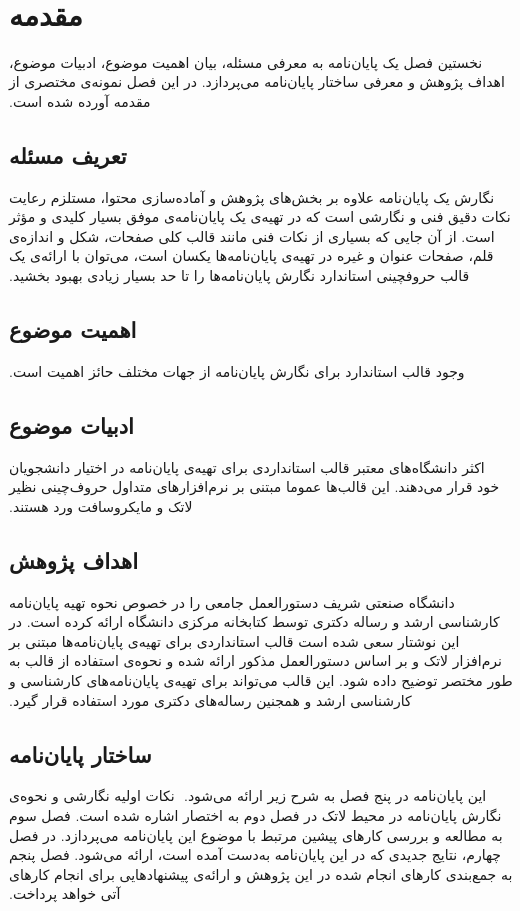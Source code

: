 
‫\chapter{مقدمه}
‫
‫نخستین فصل یک پایان‌نامه به معرفی مسئله، بیان اهمیت موضوع، ادبیات موضوع،
‫اهداف پژوهش و معرفی ساختار پایان‌نامه می‌پردازد.
‫در این فصل نمونه‌ی مختصری از مقدمه آورده شده است.
‫
‫\section{تعریف مسئله}
‫
‫نگارش یک پایان‌نامه‌ علاوه بر بخش‌های پژوهش و آماده‌سازی محتوا،
‫مستلزم رعایت نکات دقیق فنی و نگارشی است 
‫که در تهیه‌ی یک پایان‌نامه‌ی موفق بسیار کلیدی و مؤثر است.
‫از آن جایی که بسیاری از نکات فنی مانند قالب کلی صفحات، شکل و اندازه‌ی قلم، 
‫صفحات عنوان و غیره در تهیه‌ی پایان‌نامه‌ها یکسان است،
‫می‌توان با ارائه‌ی یک قالب حروفچینی استاندارد 
‫نگارش پایان‌نامه‌ها را تا حد بسیار زیادی بهبود بخشید.
‫
‫\section{اهمیت موضوع}
‫
‫وجود قالب استاندارد برای نگارش پایان‌نامه از جهات مختلف حائز اهمیت است.
‫
‫\section{ادبیات موضوع}
‫
‫اکثر دانشگاه‌های معتبر قالب استانداردی برای تهیه‌ی پایان‌نامه در اختیار دانشجویان خود قرار می‌دهند.
‫این قالب‌ها عموما مبتنی بر نرم‌افزارهای متداول حروف‌چینی نظیر لاتک و مایکروسافت ورد هستند.
‫‫
‫
‫\section{اهداف پژوهش}
‫
‫دانشگاه صنعتی شریف دستورالعمل جامعی را در خصوص
‫نحوه تهیه پایان‌نامه کارشناسی ارشد و رساله دکتری توسط کتابخانه مرکزی دانشگاه ارائه کرده است.
‫در این نوشتار سعی شده است قالب استانداردی برای تهیه‌ی پایان‌نامه‌ها مبتنی بر نرم‌افزار لاتک و
‫بر اساس دستورالعمل مذکور ارائه شده و
‫نحوه‌ی استفاده از قالب به طور مختصر توضیح داده شود.
‫این قالب  می‌تواند برای تهیه‌ی پایان‌نامه‌های کارشناسی و کارشناسی ارشد 
‫و همجنین رساله‌ها‌ی دکتری مورد استفاده قرار گیرد.
‫
‫\section{ساختار پایان‌نامه}
‫
‫این پایان‌نامه در پنج فصل به شرح زیر ارائه می‌شود.
‫%
‫نکات اولیه نگارشی و نحوه‌ی نگارش پایان‌نامه در محیط لاتک در  فصل دوم به اختصار اشاره شده است. 
‫فصل سوم به مطالعه و بررسی کارهای پیشین مرتبط با موضوع این پایان‌نامه می‌پردازد.
‫در فصل چهارم، نتایج جدیدی که در این پایان‌نامه به‌دست آمده است، ارائه می‌شود.
‫فصل پنجم به جمع‌بندی کارهای انجام شده در این پژوهش و ارائه‌ی پیشنهادهایی برای انجام کارهای آتی خواهد پرداخت.
